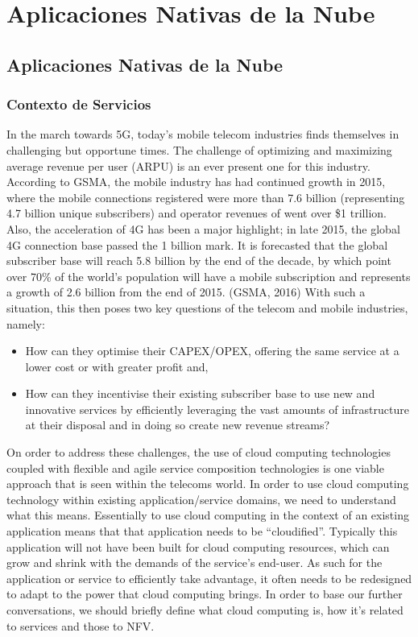 \chapter{Aplicaciones Nativas de la Nube}

\section{Aplicaciones Nativas de la Nube}

	\subsection{Contexto de Servicios}
    In the march towards 5G, today’s mobile telecom industries finds themselves in challenging but opportune times. The challenge of optimizing and maximizing average revenue per user (ARPU) is an ever present one for this industry. According to GSMA, the mobile industry has had continued growth in 2015, where the mobile connections registered were more than 7.6 billion (representing 4.7 billion unique subscribers) and operator revenues of went over \$1 trillion. Also, the acceleration of 4G has been a major highlight; in late 2015, the global 4G connection base passed the 1 billion mark. It is forecasted that the global subscriber base will reach 5.8 billion by the end of the decade, by which point over 70\% of the world’s population will have a mobile subscription and represents a growth of 2.6 billion from the end of 2015. \addref{}(GSMA, 2016) With such a situation, this then poses two key questions of the telecom and mobile industries, namely:

    \begin{itemize}
    \item How can they optimise their CAPEX/OPEX, offering the same service at a lower cost or with greater profit and,
    \item How can they incentivise their existing subscriber base to use new and innovative services by efficiently leveraging the vast amounts of infrastructure at their disposal and in doing so create new revenue streams?
    \end{itemize}
    
    On order to address these challenges, the use of cloud computing technologies coupled with flexible and agile service composition technologies is one viable approach that is seen within the telecoms world. In order to use cloud computing technology within existing application/service domains, we need to understand what this means. Essentially to use cloud computing in the context of an existing application means that that application needs to be “cloudified”. Typically this application will not have been built for cloud computing resources, which can grow and shrink with the demands of the service’s end-user. As such for the application or service to efficiently take advantage, it often needs to be redesigned to adapt to the power that cloud computing brings. In order to base our further conversations, we should briefly define what cloud computing is, how it’s related to services and those to NFV.
	
